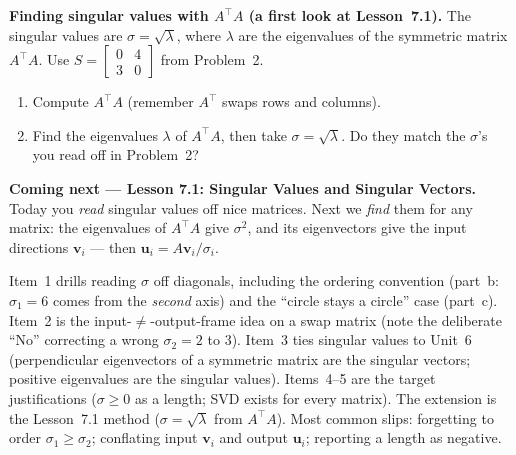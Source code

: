 \documentclass[10pt]{article}
\newcommand{\uu}{\mathbf{u}}
\newcommand{\vv}{\mathbf{v}}
\newcommand{\T}{^{\top}}
\begin{document}
\begin{extensionbox}
\textbf{Finding singular values with $A\T A$ (a first look at Lesson~7.1).} The singular values are
$\sigma=\sqrt{\lambda}$, where $\lambda$ are the eigenvalues of the symmetric matrix $A\T A$. Use
$S=\begin{bmatrix} 0 & 4 \\ 3 & 0 \end{bmatrix}$ from Problem~2.
\begin{enumerate}[label=(\alph*), leftmargin=1.8em, itemsep=5pt]
  \item Compute $A\T A$ (remember $A\T$ swaps rows and columns).
  \item Find the eigenvalues $\lambda$ of $A\T A$, then take $\sigma=\sqrt{\lambda}$. Do they match the
        $\sigma$'s you read off in Problem~2?
\end{enumerate}
\ansline{(a) $A\T=\begin{bsmallmatrix} 0 & 3\\ 4 & 0 \end{bsmallmatrix}$, so $A\T A=\begin{bsmallmatrix} 9 & 0\\ 0 & 16 \end{bsmallmatrix}$.}
\end{extensionbox}

\begin{spiralbox}
\textbf{Coming next --- Lesson 7.1: Singular Values and Singular Vectors.} Today you \emph{read} singular
values off nice matrices. Next we \emph{find} them for any matrix: the eigenvalues of $A\T A$ give
$\sigma^2$, and its eigenvectors give the input directions $\vv_i$ --- then $\uu_i=A\vv_i/\sigma_i$.
\end{spiralbox}

\begin{teachernote}
Item~1 drills reading $\sigma$ off diagonals, including the ordering convention (part~b: $\sigma_1=6$
comes from the \emph{second} axis) and the ``circle stays a circle'' case (part~c). Item~2 is the
input-$\ne$-output-frame idea on a swap matrix (note the deliberate ``No'' correcting a wrong $\sigma_2=2$
to $3$). Item~3 ties singular values to Unit~6 (perpendicular eigenvectors of a symmetric matrix are the
singular vectors; positive eigenvalues are the singular values). Items~4--5 are the target justifications
($\sigma\ge0$ as a length; SVD exists for every matrix). The extension is the Lesson~7.1 method
($\sigma=\sqrt{\lambda}$ from $A\T A$). Most common slips: forgetting to order $\sigma_1\ge\sigma_2$;
conflating input $\vv_i$ and output $\uu_i$; reporting a length as negative.
\end{teachernote}
\end{document}
